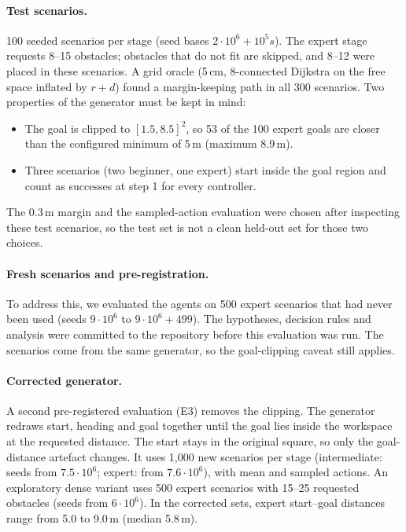 \documentclass[11pt]{article}
\theoremstyle{definition}
\theoremstyle{remark}
\begin{document}
\paragraph{Test scenarios.} 100 seeded scenarios per stage (seed bases $2\cdot10^6+10^5 s$). The expert stage requests 8--15 obstacles; obstacles that do not fit are skipped, and 8--12 were placed in these scenarios. A grid oracle (5\,cm, 8-connected Dijkstra on the free space inflated by $r+d$) found a margin-keeping path in all 300 scenarios. Two properties of the generator must be kept in mind:
\begin{itemize}
  \item The goal is clipped to $[1.5,8.5]^2$, so 53 of the 100 expert goals are closer than the configured minimum of 5\,m (maximum 8.9\,m).
  \item Three scenarios (two beginner, one expert) start inside the goal region and count as successes at step 1 for every controller.
\end{itemize}
The 0.3\,m margin and the sampled-action evaluation were chosen after inspecting these test scenarios, so the test set is not a clean held-out set for those two choices.

\paragraph{Fresh scenarios and pre-registration.} To address this, we evaluated the agents on 500 expert scenarios that had never been used (seeds $9\cdot10^6$ to $9\cdot10^6+499$). The hypotheses, decision rules and analysis were committed to the repository before this evaluation was run. The scenarios come from the same generator, so the goal-clipping caveat still applies.

\paragraph{Corrected generator.} A second pre-registered evaluation (E3) removes the clipping. The generator redraws start, heading and goal together until the goal lies inside the workspace at the requested distance. The start stays in the original square, so only the goal-distance artefact changes. It uses 1{,}000 new scenarios per stage (intermediate: seeds from $7.5\cdot10^6$; expert: from $7.6\cdot10^6$), with mean and sampled actions. An exploratory dense variant uses 500 expert scenarios with 15--25 requested obstacles (seeds from $6\cdot10^6$). In the corrected sets, expert start--goal distances range from 5.0 to 9.0\,m (median 5.8\,m).
\end{document}
